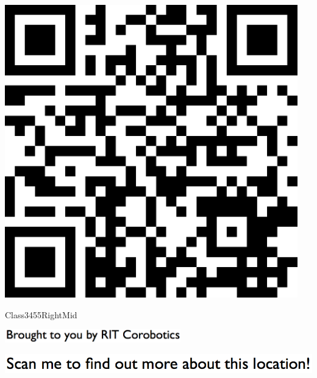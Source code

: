 \documentclass[letterpaper]{article}
\begin{document}
 \begingroup 
 \centerline{\includegraphics[scale=1,width=5in,height=5in]{Class3455RightMid.png}} 
 \endgroup 
 \vspace*{\fill} 

 \hfill{\small Class3455RightMid} 

  \vspace{0.7in} 
 
 \centerline{\includegraphics[scale=1,width=3in]{text-bottom.png}} 
 
 \pagebreak 
{} 
 \vspace*{\fill} 
 
  \centerline{\includegraphics[scale=1,width=6in]{text-top.png}} 
 
 \vspace{0.5in} 
 
\end{document}
